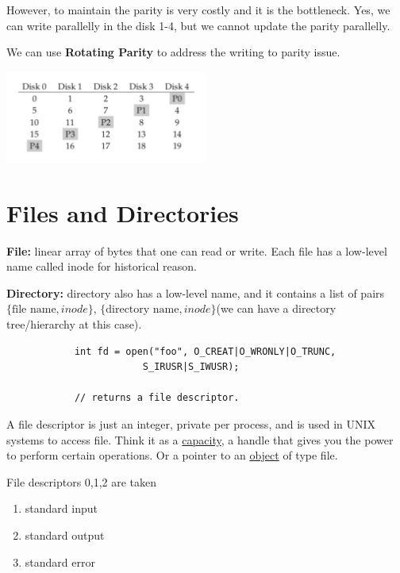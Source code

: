         However, to maintain the parity is very costly and it is the bottleneck.
        Yes, we can write parallelly in the disk 1-4, but we cannot update the parity 
        parallelly.


        We can use \textbf{Rotating Parity} to address the writing to parity 
        issue.

        \includegraphics[width=0.5\textwidth]{chapters/Persistence/persistence/level_5.png}


\section{Files and Directories}

        \textbf{File:} linear array of bytes that one can read or write. Each file 
        has a low-level name called inode for historical reason.

        \textbf{Directory:} directory also has a low-level name,
        and it contains a list of pairs $\lbrace \text{file name}, inode \rbrace$,
        $\lbrace \text{directory name}, inode \rbrace$(we can have a directory 
        tree/hierarchy at this case).

        
        \begin{lstlisting}
            int fd = open("foo", O_CREAT|O_WRONLY|O_TRUNC,
                        S_IRUSR|S_IWUSR);

            // returns a file descriptor.
        \end{lstlisting}

        A file descriptor is just an integer, private per process, and is used in 
        UNIX systems to access file. Think it as a \underline{capacity}, a 
        handle that gives you the power to perform certain operations.
        Or a pointer to an \underline{object} of type file.


        File descriptors 0,1,2 are taken
        \begin{enumerate}
            \item standard input 
            \item standard output 
            \item standard error
        \end{enumerate}

